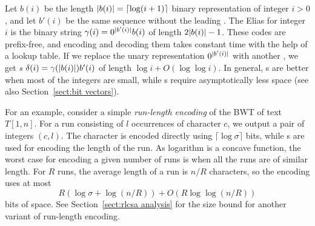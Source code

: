 \newpage Let $b(i)$ be the length $\lvert b(i) \rvert = \lceil \log (i+1) \rceil$ binary representation of integer $i > 0$, and let $b'(i)$ be the same sequence without the leading \onebit. The Elias \emph{\gammacode} for integer $i$ is the binary string $\gamma(i) = 0^{\lvert b'(i) \rvert}  b(i)$ of length $2\lvert b(i) \rvert - 1$. These codes are prefix-free, and encoding and decoding them takes constant time with the help of a lookup table. If we replace the unary representation $0^{\lvert b'(i) \rvert}$ with another \gammacode, we get \emph{\deltacode{}s} $\delta(i) = \gamma(\lvert b(i) \rvert) b'(i)$ of length $\log i + O(\log \log i)$. In general, \gammacode{}s are better when most of the integers are small, while \deltacode{}s require asymptotically less space (see also Section~\ref{sect:bit vectors}).

For an example, consider a simple \emph{run-length encoding} of the BWT of text $T[1,n]$. For a run consisting of $l$ occurrences of character $c$, we output a pair of integers $(c, l)$. The character is encoded directly using $\lceil \log \sigma \rceil$ bits, while \deltacode{}s are used for encoding the length of the run. As logarithm is a concave function, the worst case for encoding a given number of runs is when all the runs are of similar length. For $R$ runs, the average length of a run is $n / R$ characters, so the encoding uses at most
$$
R (\log \sigma + \log (n / R)) + O(R \log \log (n / R))
$$
bits of space. See Section~\ref{sect:rlcsa analysis} for the size bound for another variant of run-length encoding.
